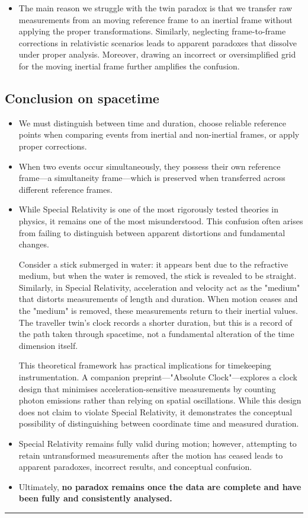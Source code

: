 \documentclass[pdflatex,sn-basic]{sn-jnl}
\theoremstyle{thmstyleone}%
\theoremstyle{thmstyletwo}%
\theoremstyle{thmstylethree}%
\begin{document}
\begin{itemize}
 			\item The main reason we struggle with the twin paradox is that we transfer raw measurements from an moving reference frame to an inertial frame without applying the proper transformations. Similarly, neglecting frame-to-frame corrections in relativistic scenarios leads to apparent paradoxes that dissolve under proper analysis. Moreover, drawing an incorrect or oversimplified grid for the moving inertial frame further amplifies the confusion.
		\end{itemize}
	\subsection{Conclusion on spacetime}\label{subsec6_3}
		\begin{itemize}
			\item We must distinguish between time and duration, choose reliable reference points when comparing events from inertial and non-inertial frames, or apply proper corrections. 
			\item When two events occur simultaneously, they possess their own reference frame—a simultaneity frame—which is preserved when transferred across different reference frames.
			\item While Special Relativity is one of the most rigorously tested theories in physics, it remains one of the most misunderstood. This confusion often arises from failing to distinguish between apparent distortions and fundamental changes.

Consider a stick submerged in water: it appears bent due to the refractive medium, but when the water is removed, the stick is revealed to be straight. Similarly, in Special Relativity, acceleration and velocity act as the "medium" that distorts measurements of length and duration. When motion ceases and the "medium" is removed, these measurements return to their inertial values. The traveller twin's clock records a shorter duration, but this is a record of the path taken through spacetime, not a fundamental alteration of the time dimension itself.

	This theoretical framework has practical implications for timekeeping instrumentation. A companion preprint—"Absolute Clock"—explores a clock design that minimises acceleration-sensitive measurements by counting photon emissions rather than relying on spatial oscillations. While this design does not claim to violate Special Relativity, it demonstrates the conceptual possibility of distinguishing between coordinate time and measured duration.
	
			\item Special Relativity remains fully valid during motion; however, attempting to retain untransformed measurements after the motion has ceased leads to apparent paradoxes, incorrect results, and conceptual confusion. 
			
			\item Ultimately, \textbf{no paradox remains once the data are complete and have been fully and consistently analysed.}
		\end{itemize}
\noindent\rule{\textwidth}{0.4pt}

\end{document}
